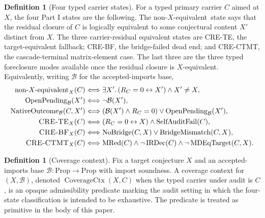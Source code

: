 \documentclass[11pt]{article}
\newcommand{\Xequiv}{$X$-equivalent}
\newcommand{\nonXequiv}{non-$X$-equivalent}
\newcommand{\CRETE}{\textsc{CRE-TE}}
\newcommand{\CREBF}{\textsc{CRE-BF}}
\newcommand{\CRECTMT}{\textsc{CRE-CTMT}}
\theoremstyle{definition}
\newtheorem{definition}[theorem]{Definition}
\begin{document}
\begin{definition}[Four typed carrier states]\label{def:four-typed-states}
For a typed primary carrier \(C\) aimed at \(X\), the four Part I
states are the following.  The \nonXequiv\ state says that the
residual closure of \(C\) is logically equivalent to some conjectural
content \(X'\) distinct from \(X\).  The three carrier-residual
equivalent states are \CRETE, the target-equivalent fallback;
\CREBF, the bridge-failed dead end; and \CRECTMT, the
cascade-terminal matrix-element case.  The last three are the
three typed foreclosure modes available once the residual closure is
\Xequiv.
Equivalently, writing \(\mathcal B\) for the accepted-imports base,
\[
\begin{aligned}
  \mbox{\nonXequiv}_X(C)
    &\Longleftrightarrow
      \exists X'.\, (R_C=0\leftrightarrow X')\wedge X'\neq X,\\
  \operatorname{OpenPending}_{\mathcal B}(X')
    &\Longleftrightarrow \neg \mathcal B(X'),\\
  \operatorname{NativeOutcome}_{\mathcal B}(C,X')
    &\Longleftrightarrow
      (\mathcal B(X')\wedge R_C=0)\vee
      \operatorname{OpenPending}_{\mathcal B}(X'),\\
  \mbox{\CRETE}_X(C)
    &\Longleftrightarrow
      (R_C=0\leftrightarrow X)\wedge
      \operatorname{SelfAuditFail}(C),\\
  \mbox{\CREBF}_X(C)
    &\Longleftrightarrow
      \operatorname{NoBridge}(C,X)\vee
      \operatorname{BridgeMismatch}(C,X),\\
  \mbox{\CRECTMT}_X(C)
    &\Longleftrightarrow
      \operatorname{MRed}(C)\wedge
      \neg\operatorname{IRDec}(C)\wedge
      \neg\operatorname{MDEqTarget}(C,X).
\end{aligned}
\]
\end{definition}

\begin{definition}[Coverage context]\label{def:coverage-ctx}
Fix a target conjecture \(X\) and an accepted-imports base
\(\mathcal B:\mathrm{Prop}\to\mathrm{Prop}\) with import soundness.  A
coverage context for \((X,\mathcal B)\), denoted
\(\operatorname{CoverageCtx}(X,C)\) when the typed carrier under audit is
\(C\), is an opaque admissibility predicate marking the audit setting in
which the four-state classification is intended to be exhaustive.  The
predicate is treated as primitive in the body of this paper.
\end{definition}
\end{document}

